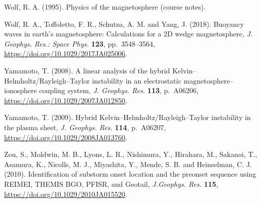 \documentclass[a4paper,openany,12pt]{book}
\begin{document}
\begin{thebibliography}{100}
\bibitem{}
Wolf, R. A. (1995). Physics of the magnetosphere (course notes).

\bibitem{}
Wolf, R. A., Toffoletto, F. R., Schutza, A. M. and Yang, J. (2018). Buoyancy waves in earth's magnetosphere: Calculations for a 2D wedge magnetosphere, \emph{J. Geophys. Res.: Space Phys.} \textbf{123}, pp.~3548--3564, 
\url{https://doi.org/10.1029/2017JA025006}.

\bibitem{}
Yamamoto, T. (2008). A linear analysis of the hybrid Kelvin--Helmholtz/Rayleigh--Taylor instability in an electrostatic magnetosphere--ionosphere coupling system, \emph{J. Geophys. Res.} \textbf{113}, p.~A06206, \url{https://doi.org/10.1029/2007JA012850}.

\bibitem{} 
Yamamoto, T. (2009). Hybrid Kelvin--Helmholtz/Rayleigh--Taylor instability in the plasma sheet, \emph{J. Geophys. Res.} \textbf{114}, p.~A06207, \url{https://doi.org/10.1029/2008JA013760}.

\bibitem{}
Zou, S., Moldwin, M. B., Lyons, L. R., Nishimura, Y., Hirahara, M., Sakanoi, T., Asamura, K., Nicolls, M. J., Miyashita, Y., Mende, S. B. and Heinselman, C. J. (2010). Identification of substorm onset location and the preonset  sequence using REIMEI, THEMIS BGO, PFISR, and Geotail, \emph{J.Geophys. Res.} \textbf{115}, \url{https://doi.org/10.1029/2010JA015520}.

\end{thebibliography}
\end{document}

